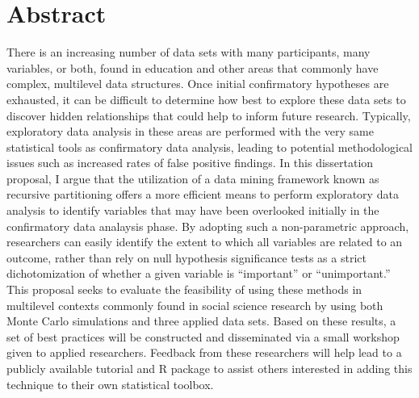 

\begingroup
\let\clearpage\relax
\let\cleardoublepage\relax
\let\cleardoublepage\relax

\chapter*{Abstract} %

	There is an increasing number of data sets with many participants, many variables, or both, found in education and other areas that commonly have complex, multilevel data structures. Once initial confirmatory hypotheses are exhausted, it can be difficult to determine how best to explore these data sets to discover hidden relationships that could help to inform future research. Typically, exploratory data analysis in these areas are performed with the very same statistical tools as confirmatory data analysis, leading to potential methodological issues such as increased rates of false positive findings. In this dissertation proposal, I argue that the utilization of a data mining framework known as recursive partitioning offers a more efficient means to perform exploratory data analysis to identify variables that may have been overlooked initially in the confirmatory data analaysis phase. By adopting such a non-parametric approach, researchers can easily identify the extent to which all variables are related to an outcome, rather than rely on null hypothesis significance tests as a strict dichotomization of whether a given variable is ``important'' or ``unimportant.'' This proposal seeks to evaluate the feasibility of using these methods in multilevel contexts commonly found in social science research by using both Monte Carlo simulations and three applied data sets. Based on these results, a set of best practices will be constructed and disseminated via a small workshop given to applied researchers. Feedback from these researchers will help lead to a publicly available tutorial and R package to assist others interested in adding this technique to their own statistical toolbox.

\endgroup			

\vfill